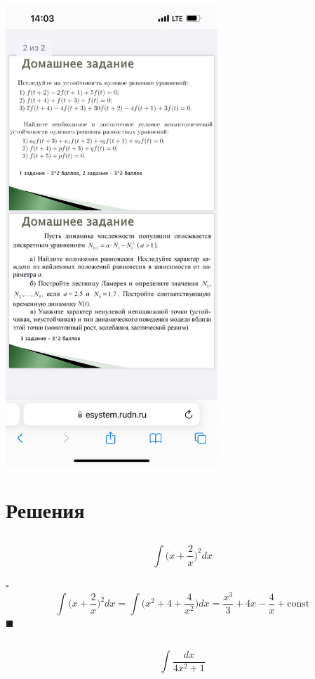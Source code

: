 \documentclass[a4paper]{article}
\newcommand{\solutionstart}{{\noindent $\square$ \\}}
\newcommand{\solutionend}{{\noindent $\blacksquare$ \\}}
\begin{document}
\begin{multicols}{2}
\includegraphics[width=8cm]{photo_2.jpg}

\end{multicols}



\section{Решения}

\subsection{}
\[
\int \biggl(x + \frac{2}{x}\biggr)^2 dx
\]

\solutionstart
\[
\int \biggl(x + \frac{2}{x}\biggr)^2 dx = \int \biggl(x^2 + 4 + \frac{4}{x^2} \biggr) dx = \frac{x^3}{3} + 4x - \frac{4}{x} + \text{const}
\]
\solutionend

\subsection{}
\[
\int \frac{dx}{4 x^2 + 1}
\]
\end{document}
